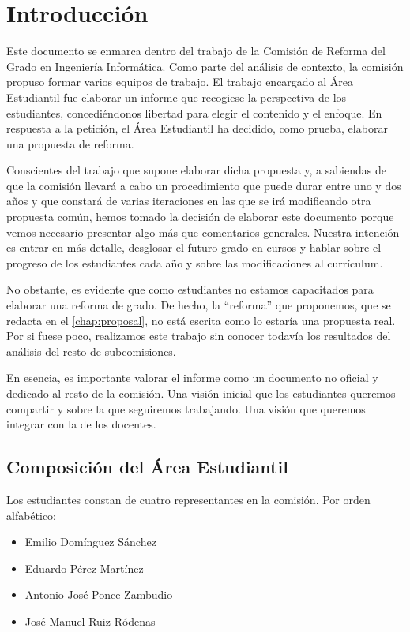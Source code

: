 \chapter{Introducción}

Este documento se enmarca dentro del trabajo de
la Comisión de Reforma del Grado en Ingeniería Informática.
Como parte del análisis de contexto,
la comisión propuso formar varios equipos de trabajo.
El trabajo encargado al Área Estudiantil fue elaborar un informe
que recogiese la perspectiva de los estudiantes,
concediéndonos libertad para elegir el contenido y el enfoque.
En respuesta a la petición,
el Área Estudiantil ha decidido, como prueba, elaborar una propuesta de reforma.

Conscientes del trabajo que supone elaborar dicha propuesta
y, a sabiendas de que la comisión llevará a cabo un procedimiento
que puede durar entre uno y dos años
y que constará de varias iteraciones en las que
se irá modificando otra propuesta común,
hemos tomado la decisión de elaborar este documento porque
vemos necesario presentar algo más que comentarios generales.
Nuestra intención es entrar en más detalle,
desglosar el futuro grado en cursos y
hablar sobre el progreso de los estudiantes cada año y
sobre las modificaciones al currículum.

No obstante, es evidente que como estudiantes
no estamos capacitados para elaborar una reforma de grado.
De hecho, la ``reforma'' que proponemos,
que se redacta en el \cref{chap:proposal},
no está escrita como lo estaría una propuesta real.
Por si fuese poco, realizamos este trabajo sin conocer todavía
los resultados del análisis del resto de subcomisiones.

En esencia, es importante valorar el informe como
un documento no oficial y dedicado al resto de la comisión.
Una visión inicial que los estudiantes queremos compartir
y sobre la que seguiremos trabajando.
Una visión que queremos integrar con la de los docentes.

\section{Composición del Área Estudiantil}

Los estudiantes constan de cuatro representantes en la comisión.
Por orden alfabético:
\begin{itemize}
    \item Emilio Domínguez Sánchez
    \item Eduardo Pérez Martínez
    \item Antonio José Ponce Zambudio
    \item José Manuel Ruiz Ródenas
\end{itemize}

